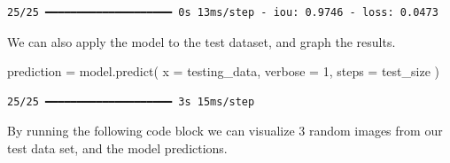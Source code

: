 \documentclass[
  letterpaper,
  DIV=11,
  numbers=noendperiod]{scrreprt}
\newenvironment{Shaded}{\begin{snugshade}}{\end{snugshade}}
\newcommand{\DecValTok}[1]{\textcolor[rgb]{0.68,0.00,0.00}{#1}}
\newcommand{\NormalTok}[1]{\textcolor[rgb]{0.00,0.23,0.31}{#1}}
\newcommand{\OperatorTok}[1]{\textcolor[rgb]{0.37,0.37,0.37}{#1}}
\begin{document}
\begin{verbatim}
25/25 ━━━━━━━━━━━━━━━━━━━━ 0s 13ms/step - iou: 0.9746 - loss: 0.0473
\end{verbatim}

We can also apply the model to the test dataset, and graph the results.

\begin{Shaded}
\begin{Highlighting}[]
\NormalTok{prediction }\OperatorTok{=}\NormalTok{ model.predict(}
\NormalTok{    x }\OperatorTok{=}\NormalTok{ testing\_data,}
\NormalTok{    verbose }\OperatorTok{=} \DecValTok{1}\NormalTok{,}
\NormalTok{    steps }\OperatorTok{=}\NormalTok{ test\_size}
\NormalTok{)}
\end{Highlighting}
\end{Shaded}

\begin{verbatim}
25/25 ━━━━━━━━━━━━━━━━━━━━ 3s 15ms/step
\end{verbatim}

By running the following code block we can visualize 3 random images
from our test data set, and the model predictions.
\end{document}
